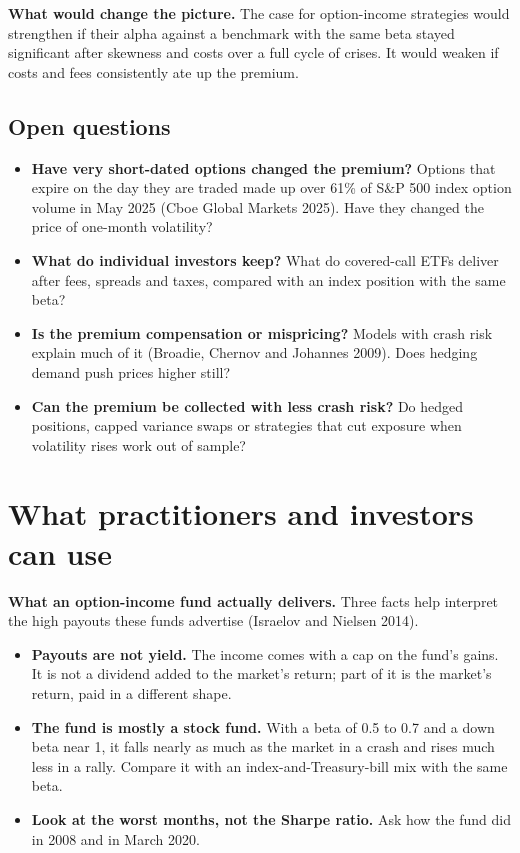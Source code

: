\textbf{What would change the picture.} The case for option-income strategies would strengthen if their alpha against a benchmark with the same beta stayed significant after skewness and costs over a full cycle of crises. It would weaken if costs and fees consistently ate up the premium.

\subsection{Open questions}
\label{sec:16-open}

\begin{itemize}
  \item \textbf{Have very short-dated options changed the premium?} Options that expire on the day they are traded made up over 61\% of S\&P 500 index option volume in May 2025 (Cboe Global Markets 2025). Have they changed the price of one-month volatility?
  \item \textbf{What do individual investors keep?} What do covered-call ETFs deliver after fees, spreads and taxes, compared with an index position with the same beta?
  \item \textbf{Is the premium compensation or mispricing?} Models with crash risk explain much of it (Broadie, Chernov and Johannes 2009). Does hedging demand push prices higher still?
  \item \textbf{Can the premium be collected with less crash risk?} Do hedged positions, capped variance swaps or strategies that cut exposure when volatility rises work out of sample?
\end{itemize}

\section{What practitioners and investors can use}
\label{sec:16-investors}

\textbf{What an option-income fund actually delivers.} Three facts help interpret the high payouts these funds advertise (Israelov and Nielsen 2014).

\begin{itemize}
  \item \textbf{Payouts are not yield.} The income comes with a cap on the fund's gains. It is not a dividend added to the market's return; part of it is the market's return, paid in a different shape.
  \item \textbf{The fund is mostly a stock fund.} With a beta of 0.5 to 0.7 and a down beta near 1, it falls nearly as much as the market in a crash and rises much less in a rally. Compare it with an index-and-Treasury-bill mix with the same beta.
  \item \textbf{Look at the worst months, not the Sharpe ratio.} Ask how the fund did in 2008 and in March 2020.
\end{itemize}

